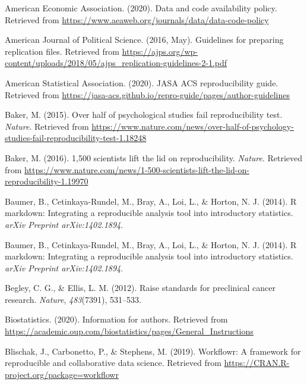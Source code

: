 \documentclass[12pt,twoside]{reedthesis}
\newenvironment{CSLReferences}%
  {}%
  {\par}
\begin{document}
\hypertarget{refs}{}
\begin{CSLReferences}{1}{0}
\leavevmode\hypertarget{ref-aee-policy}{}%
American Economic Association. (2020). Data and code availability policy. Retrieved from \url{https://www.aeaweb.org/journals/data/data-code-policy}

\leavevmode\hypertarget{ref-ajps-guidelines}{}%
American Journal of Political Science. (2016, May). Guidelines for preparing replication files. Retrieved from \url{https://ajps.org/wp-content/uploads/2018/05/ajps_replication-guidelines-2-1.pdf}

\leavevmode\hypertarget{ref-asa-guide}{}%
American Statistical Association. (2020). JASA ACS reproducibility guide. Retrieved from \url{https://jasa-acs.github.io/repro-guide/pages/author-guidelines}

\leavevmode\hypertarget{ref-nature-psych}{}%
Baker, M. (2015). Over half of psychological studies fail reproducibility test. \emph{Nature}. Retrieved from \url{https://www.nature.com/news/over-half-of-psychology-studies-fail-reproducibility-test-1.18248}

\leavevmode\hypertarget{ref-nature-crisis}{}%
Baker, M. (2016). 1,500 scientists lift the lid on reproducibility. \emph{Nature}. Retrieved from \url{https://www.nature.com/news/1-500-scientists-lift-the-lid-on-reproducibility-1.19970}

\leavevmode\hypertarget{ref-baumer2014r}{}%
Baumer, B., Cetinkaya-Rundel, M., Bray, A., Loi, L., \& Horton, N. J. (2014). R markdown: Integrating a reproducible analysis tool into introductory statistics. \emph{arXiv Preprint arXiv:1402.1894}.

\leavevmode\hypertarget{ref-baumer2014r}{}%
Baumer, B., Cetinkaya-Rundel, M., Bray, A., Loi, L., \& Horton, N. J. (2014). R markdown: Integrating a reproducible analysis tool into introductory statistics. \emph{arXiv Preprint arXiv:1402.1894}.

\leavevmode\hypertarget{ref-begley2012raise}{}%
Begley, C. G., \& Ellis, L. M. (2012). Raise standards for preclinical cancer research. \emph{Nature}, \emph{483}(7391), 531--533.

\leavevmode\hypertarget{ref-journal-biostats}{}%
Biostatistics. (2020). Information for authors. Retrieved from \url{https://academic.oup.com/biostatistics/pages/General_Instructions}

\leavevmode\hypertarget{ref-R-workflowr}{}%
Blischak, J., Carbonetto, P., \& Stephens, M. (2019). Workflowr: A framework for reproducible and collaborative data science. Retrieved from \url{https://CRAN.R-project.org/package=workflowr}


\end{CSLReferences}
\end{document}
